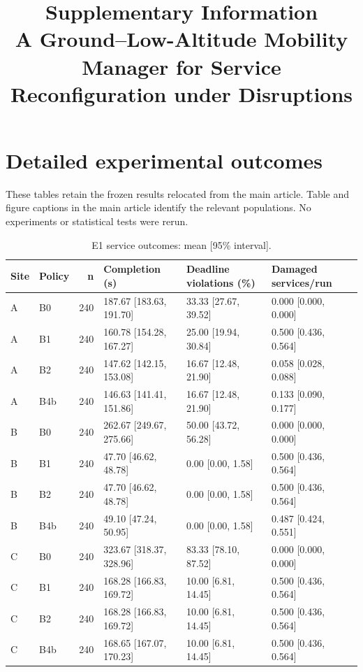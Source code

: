 \documentclass[11pt,a4paper]{article}
\title{Supplementary Information\\[8pt]\large A Ground--Low-Altitude Mobility Manager for Service Reconfiguration under Disruptions}
\author{}
\date{}
\begin{document}
\maketitle
\section{Detailed experimental outcomes}

These tables retain the frozen results relocated from the main article. Table and figure captions in the main article identify the relevant populations. No experiments or statistical tests were rerun.

\begin{table}[H]
\centering
\small
\setlength{\tabcolsep}{3pt}
\caption{E1 service outcomes: mean [95\% interval].}
\label{tab:S1}
\begin{tabularx}{\textwidth}{@{}llrYYY@{}}
\toprule
Site & Policy & n & Completion (s) & Deadline violations (\%) & Damaged services/run \\
\midrule
A & B0 & 240 & 187.67 [183.63, 191.70] & 33.33 [27.67, 39.52] & 0.000 [0.000, 0.000] \\
A & B1 & 240 & 160.78 [154.28, 167.27] & 25.00 [19.94, 30.84] & 0.500 [0.436, 0.564] \\
A & B2 & 240 & 147.62 [142.15, 153.08] & 16.67 [12.48, 21.90] & 0.058 [0.028, 0.088] \\
A & B4b & 240 & 146.63 [141.41, 151.86] & 16.67 [12.48, 21.90] & 0.133 [0.090, 0.177] \\
B & B0 & 240 & 262.67 [249.67, 275.66] & 50.00 [43.72, 56.28] & 0.000 [0.000, 0.000] \\
B & B1 & 240 & 47.70 [46.62, 48.78] & 0.00 [0.00, 1.58] & 0.500 [0.436, 0.564] \\
B & B2 & 240 & 47.70 [46.62, 48.78] & 0.00 [0.00, 1.58] & 0.500 [0.436, 0.564] \\
B & B4b & 240 & 49.10 [47.24, 50.95] & 0.00 [0.00, 1.58] & 0.487 [0.424, 0.551] \\
C & B0 & 240 & 323.67 [318.37, 328.96] & 83.33 [78.10, 87.52] & 0.000 [0.000, 0.000] \\
C & B1 & 240 & 168.28 [166.83, 169.72] & 10.00 [6.81, 14.45] & 0.500 [0.436, 0.564] \\
C & B2 & 240 & 168.28 [166.83, 169.72] & 10.00 [6.81, 14.45] & 0.500 [0.436, 0.564] \\
C & B4b & 240 & 168.65 [167.07, 170.23] & 10.00 [6.81, 14.45] & 0.500 [0.436, 0.564] \\
\bottomrule
\end{tabularx}
\end{table}
\end{document}
